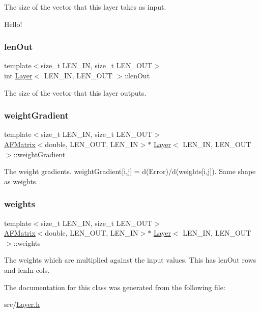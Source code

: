 The size of the vector that this layer takes as input. 

Hello! \mbox{\label{class_layer_ae10a61035ba7a18f9f2a6d1d3ebf9811}} 
\subsubsection{\texorpdfstring{len\+Out}{lenOut}}
{\footnotesize\ttfamily template$<$size\+\_\+t L\+E\+N\+\_\+\+IN, size\+\_\+t L\+E\+N\+\_\+\+O\+UT$>$ \\
int \hyperlink{class_layer}{Layer}$<$ L\+E\+N\+\_\+\+IN, L\+E\+N\+\_\+\+O\+UT $>$\+::len\+Out}



The size of the vector that this layer outputs. 

\mbox{\label{class_layer_ab4afc6b6fdda2b5fd21621f40be776fd}} 
\subsubsection{\texorpdfstring{weight\+Gradient}{weightGradient}}
{\footnotesize\ttfamily template$<$size\+\_\+t L\+E\+N\+\_\+\+IN, size\+\_\+t L\+E\+N\+\_\+\+O\+UT$>$ \\
\hyperlink{class_a_f_matrix}{A\+F\+Matrix}$<$double, L\+E\+N\+\_\+\+O\+UT, L\+E\+N\+\_\+\+IN$>$$\ast$ \hyperlink{class_layer}{Layer}$<$ L\+E\+N\+\_\+\+IN, L\+E\+N\+\_\+\+O\+UT $>$\+::weight\+Gradient}



The weight gradients. {\ttfamily weight\+Gradient\mbox{[}i,j\mbox{]} = d(\+Error)/d(weights\mbox{[}i,j\mbox{]})}. Same shape as {\ttfamily weights}. 

\mbox{\label{class_layer_aa362ee5edaf5b0fe8d5d7c4674ded7a1}} 
\subsubsection{\texorpdfstring{weights}{weights}}
{\footnotesize\ttfamily template$<$size\+\_\+t L\+E\+N\+\_\+\+IN, size\+\_\+t L\+E\+N\+\_\+\+O\+UT$>$ \\
\hyperlink{class_a_f_matrix}{A\+F\+Matrix}$<$double, L\+E\+N\+\_\+\+O\+UT, L\+E\+N\+\_\+\+IN$>$$\ast$ \hyperlink{class_layer}{Layer}$<$ L\+E\+N\+\_\+\+IN, L\+E\+N\+\_\+\+O\+UT $>$\+::weights}



The weights which are multiplied against the input values. This has {\ttfamily len\+Out} rows and {\ttfamily len\+In} cols. 



The documentation for this class was generated from the following file\+:\begin{DoxyCompactItemize}
\item 
src/\hyperlink{_layer_8h}{Layer.\+h}\end{DoxyCompactItemize}
